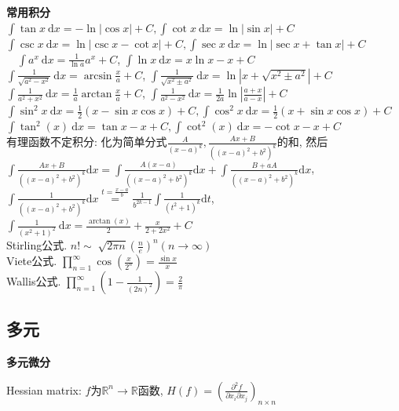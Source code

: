 \documentclass[UTF8]{ctexart}
\begin{document}
\noindent \textbf{常用积分}\\
$\int\tan x \mathrm{~d} x=-\ln |\cos x|+C,\int\cot x \mathrm{~d} x=\ln |\sin x|+C $\\
$\int\csc x\mathrm{~d}x=\ln|\csc x-\cot x|+C,\int\sec x \mathrm{~d} x=\ln |\sec x+\tan x|+C $\\
$\quad \int a^{x} \mathrm{~d} x=\frac{1}{\ln a} a^{x}+C $, $\int \ln x \mathrm{~d} x= x \ln x -x +C$\\
$\int \frac{1}{\sqrt{a^2-x^{2}}} \mathrm{~d} x=\arcsin\frac{x}{a}+C $,
$\int \frac{1}{\sqrt{x^{2}\pm a^{2}}} \mathrm{~d} x=\ln \left|x+\sqrt{x^{2}\pm a^{2}}\right|+C$ \\
$\int \frac{1}{a^2+x^{2}} \mathrm{~d} x=\frac{1}{a}\arctan\frac{x}{a}+C $,
$\int \frac{1}{a^2-x^2}\mathrm{~d}x=\frac{1}{2a}\ln|\frac{a+x}{a-x}|+C $\\
$\int \sin ^{2} x \mathrm{~d} x=\frac{1}{2}(x-\sin x \cos x)+C ,\int \cos ^{2} x \mathrm{~d} x=\frac{1}{2}(x+\sin x \cos x)+C$\\
$\int \tan^2(x)\mathrm{~d} x=\tan x-x+C,\int\cot^2(x)\mathrm{~d} x=-\cot x-x+C$ \\
有理函数不定积分: 化为简单分式$\frac{A}{(x-a)^{k}}, \frac{A x+B}{\left((x-a)^{2}+b^{2}\right)^{k}}$的和, 然后
$\int \frac{A x+B}{\left((x-a)^{2}+b^{2}\right)^{k}} \mathrm{d} x 
= \int \frac{A(x-a)}{\left((x-a)^{2}+b^{2}\right)^{k}} \mathrm{d} x
+\int \frac{B+a A}{\left((x-a)^{2}+b^{2}\right)^{k}} \mathrm{d} x $, 
$\int \frac{1}{\left((x-a)^{2}+b^{2}\right)^{k}} \mathrm{d} x \stackrel{t=\frac{x-a}{b}}{=}
\frac{1}{b^{2 k-1}} \int \frac{1}{\left(t^{2}+1\right)^{k}} \mathrm{d} t$, \\
$\int \frac{1}{\left(x^{2}+1\right)^{2}} \mathrm{~d} x=\frac{\arctan(x)}{2}+\frac{x}{2+2x^2}+C$\\

\noindent Stirling公式. $n!\sim \sqrt[]{2\pi n}\left(\frac{n}{e}\right)^n (n\to\infty )$\\
Viete公式. $\prod_{n=1}^{\infty} \cos (\frac{x}{2^n})=\frac{\sin x}{x} $\\
Wallis公式. $\prod_{n=1}^{\infty} (1-\frac{1}{(2n)^2})=\frac{2}{\pi } $\\


\subsection{多元}

\noindent \textbf{多元微分}

Hessian matrix: $f$为$\mathbb{R}^n\to\mathbb{R}$函数,
$H(f)=\left(\frac{\partial^2 f}{\partial x_i \partial x_j}\right)_{n\times n}$
\end{document}
